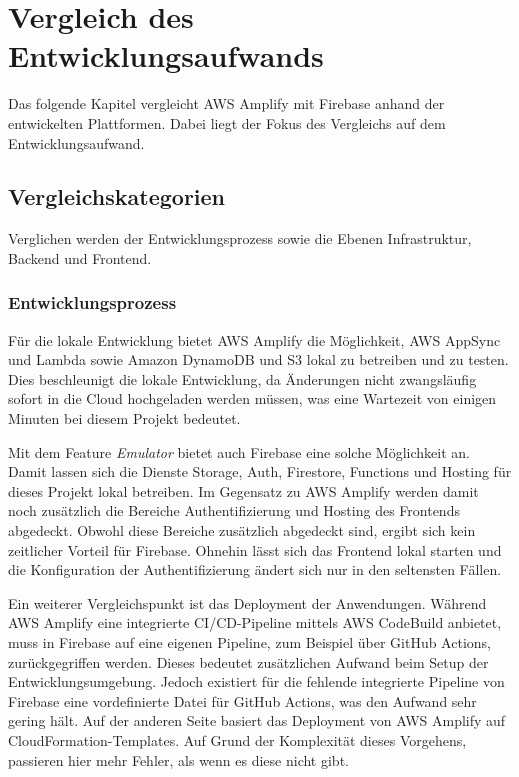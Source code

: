 \chapter{Vergleich des Entwicklungsaufwands}

Das folgende Kapitel vergleicht \ac{AWS} Amplify mit Firebase anhand der entwickelten Plattformen. Dabei liegt der Fokus des Vergleichs auf dem Entwicklungsaufwand.

\section{Vergleichskategorien}

Verglichen werden der Entwicklungsprozess sowie die Ebenen Infrastruktur, Backend und Frontend.

\subsection{Entwicklungsprozess}

Für die lokale Entwicklung bietet \ac{AWS} Amplify die Möglichkeit, \ac{AWS} AppSync und Lambda sowie Amazon DynamoDB und S3 lokal zu betreiben und zu testen. Dies beschleunigt die lokale Entwicklung, da Änderungen nicht zwangsläufig sofort in die Cloud hochgeladen werden müssen, was eine Wartezeit von einigen Minuten bei diesem Projekt bedeutet.

Mit dem Feature \textit{Emulator} bietet auch Firebase eine solche Möglichkeit an. Damit lassen sich die Dienste Storage, Auth, Firestore, Functions und Hosting für dieses Projekt lokal betreiben. Im Gegensatz zu \ac{AWS} Amplify werden damit noch zusätzlich die Bereiche Authentifizierung und Hosting des Frontends abgedeckt. Obwohl diese Bereiche zusätzlich abgedeckt sind, ergibt sich kein zeitlicher Vorteil für Firebase. Ohnehin lässt sich das Frontend lokal starten und die Konfiguration der Authentifizierung ändert sich nur in den seltensten Fällen.

Ein weiterer Vergleichspunkt ist das Deployment der Anwendungen. Während \ac{AWS} Amplify eine integrierte CI/CD-Pipeline mittels \ac{AWS} CodeBuild anbietet, muss in Firebase auf eine eigenen Pipeline, zum Beispiel über GitHub Actions, zurückgegriffen werden. Dieses bedeutet zusätzlichen Aufwand beim Setup der Entwicklungsumgebung. Jedoch existiert für die fehlende integrierte Pipeline von Firebase eine vordefinierte Datei für GitHub Actions, was den Aufwand sehr gering hält. Auf der anderen Seite basiert das Deployment von \ac{AWS} Amplify auf CloudFormation-Templates. Auf Grund der Komplexität dieses Vorgehens, passieren hier mehr Fehler, als wenn es diese nicht gibt.

